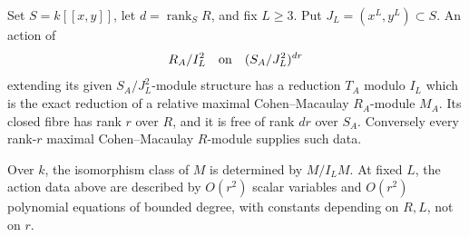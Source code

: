 \begin{lemma}
\label{D:relative-Artin-module-realization}
Set \(S=k[[x,y]]\), let \(d=\operatorname{rank}_S R\), and fix \(L\geq3\).
Put \(J_L=(x^L,y^L)\subset S\).
An action of
\[
 R_A/I_L^2 \quad\hbox{on}\quad
 (S_A/J_L^2)^{dr}
\]
extending its given \(S_A/J_L^2\)-module structure has a reduction \(T_A\)
modulo \(I_L\) which is the exact reduction of a relative maximal
Cohen--Macaulay \(R_A\)-module \(M_A\).
Its closed fibre has rank \(r\) over \(R\), and it is free of rank \(dr\)
over \(S_A\). Conversely every rank-\(r\) maximal Cohen--Macaulay
\(R\)-module supplies such data.

Over \(k\), the isomorphism class of \(M\) is determined by
\(M/I_LM\). At fixed \(L\), the action data above are described by
\(O(r^2)\) scalar variables and \(O(r^2)\) polynomial equations of
bounded degree, with constants depending on \(R,L\), not on \(r\).
\end{lemma}


